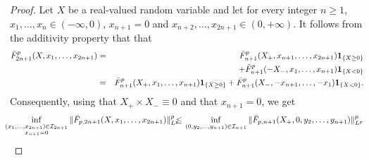 \begin{proof}
  
  Let $X$ be a real-valued random variable  and let for every integer $n\ge 1$, $x_1,\ldots,x_n\!\in (-\infty,0)$,  $x_{n+1}=0$  and $x_{n+2},\ldots,x_{2n+1}\!\in (0,+\infty)$. It follows from the additivity property that  that 
\begin{eqnarray*}  
 \nonumber \bar F^p_{2n+1}(X, x_1,\ldots,x_{2n+1}) &=&\bar F^{p}_{n+1}(X_+, x_{n+1},\ldots,x_{2n+1})\mbox{\bf 1}_{\{X\ge 0\}}  \\
 &&+  \bar F^{p}_{n+1}(-X_-, x_{1},\ldots,x_{n+1})\mbox{\bf 1}_{\{X<0\}} \\
\label{IneqA} &=& \bar F^{p}_{n+1}(X_+, x_1,\ldots,x_{n+1})\mbox{\bf 1}_{\{X
\ge 0\}}   +  \bar F^{p}_{n+1}(X_-, -x_{n+1},\ldots,-x_{1})\mbox{\bf 1}_{\{X<0\}}.
 \end{eqnarray*} 
Consequently, using that $X_+\times X_- \equiv 0$ and that $x_{n+1}=0$, we get 
\begin{eqnarray*}  
  \!\!\!\!\inf_{\substack{(x_1,\ldots,x_{2n+1})\in {\cal
  I}_{2n+1}\\ x _{n+1}=0}}\|\bar F_{p,2n+1}(X,
  x_1,\ldots,x_{2n+1})\|^p_{L^p} \!\!&\!\!\le\!\!&\!\!  \inf_{ (0,y_2,\ldots,y_{n+1})\in {\cal I}_{n+1}} \|\bar F_{p,n+1}(X_+,0,y_2,\ldots,y_{n+1}) \|^p_{L^p} \\

\end{eqnarray*}
\end{proof}
